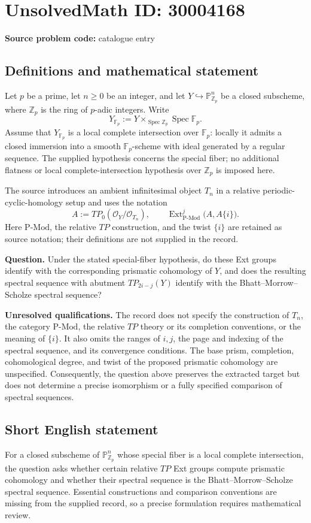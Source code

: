 \documentclass[11pt]{article}
\newcommand{\Z}{\mathbb{Z}}
\newcommand{\F}{\mathbb{F}}
\newcommand{\PP}{\mathbb{P}}
\begin{document}
\section*{UnsolvedMath ID: 30004168}
\textbf{Source problem code:} catalogue entry
\subsection{Definitions and mathematical statement}
Let \(p\) be a prime, let \(n\geq 0\) be an integer, and let \(Y\hookrightarrow\PP^n_{\Z_p}\) be a closed subscheme, where \(\Z_p\) is the ring of \(p\)-adic integers. Write
\[
Y_{\F_p}:=Y\times_{\operatorname{Spec}\Z_p}\operatorname{Spec}\F_p.
\]
Assume that \(Y_{\F_p}\) is a local complete intersection over \(\F_p\): locally it admits a closed immersion into a smooth \(\F_p\)-scheme with ideal generated by a regular sequence. The supplied hypothesis concerns the special fiber; no additional flatness or local complete-intersection hypothesis over \(\Z_p\) is imposed here.

The source introduces an ambient infinitesimal object \(T_n\) in a relative periodic-cyclic-homology setup and uses the notation
\[
A:=TP_0(\mathcal O_Y/\mathcal O_{T_n}),\qquad
\operatorname{Ext}^{j}_{\mathrm{P\text{-}Mod}}\bigl(A,A\{i\}\bigr).
\]
Here \(\mathrm{P\text{-}Mod}\), the relative \(TP\) construction, and the twist \(\{i\}\) are retained as source notation; their definitions are not supplied in the record.

\textbf{Question.} Under the stated special-fiber hypothesis, do these Ext groups identify with the corresponding prismatic cohomology of \(Y\), and does the resulting spectral sequence with abutment \(TP_{2i-j}(Y)\) identify with the Bhatt--Morrow--Scholze spectral sequence?

\textbf{Unresolved qualifications.} The record does not specify the construction of \(T_n\), the category \(\mathrm{P\text{-}Mod}\), the relative \(TP\) theory or its completion conventions, or the meaning of \(\{i\}\). It also omits the ranges of \(i,j\), the page and indexing of the spectral sequence, and its convergence conditions. The base prism, completion, cohomological degree, and twist of the proposed prismatic cohomology are unspecified. Consequently, the question above preserves the extracted target but does not determine a precise isomorphism or a fully specified comparison of spectral sequences.
\subsection{Short English statement}
For a closed subscheme of \(\PP^n_{\Z_p}\) whose special fiber is a local complete intersection, the question asks whether certain relative \(TP\) Ext groups compute prismatic cohomology and whether their spectral sequence is the Bhatt--Morrow--Scholze spectral sequence. Essential constructions and comparison conventions are missing from the supplied record, so a precise formulation requires mathematical review.
\end{document}
